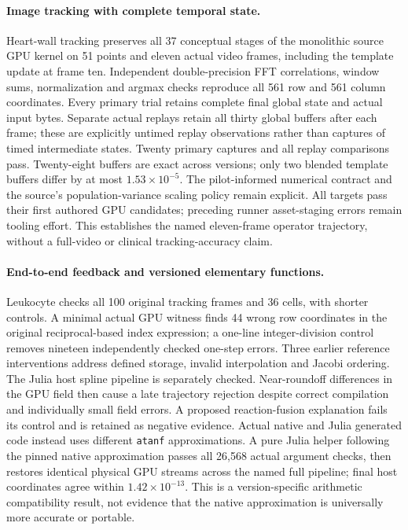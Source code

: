 \paragraph{Image tracking with complete temporal state.}
Heart-wall tracking preserves all 37 conceptual stages of the monolithic source GPU kernel on 51 points and eleven actual video frames, including the template update at frame ten. Independent double-precision FFT correlations, window sums, normalization and argmax checks reproduce all 561 row and 561 column coordinates. Every primary trial retains complete final global state and actual input bytes. Separate actual replays retain all thirty global buffers after each frame; these are explicitly untimed replay observations rather than captures of timed intermediate states. Twenty primary captures and all replay comparisons pass. Twenty-eight buffers are exact across versions; only two blended template buffers differ by at most $1.53\times10^{-5}$. The pilot-informed numerical contract and the source's population-variance scaling policy remain explicit. All targets pass their first authored GPU candidates; preceding runner asset-staging errors remain tooling effort. This establishes the named eleven-frame operator trajectory, without a full-video or clinical tracking-accuracy claim.

\paragraph{End-to-end feedback and versioned elementary functions.}
Leukocyte checks all 100 original tracking frames and 36 cells, with shorter controls. A minimal actual GPU witness finds 44 wrong row coordinates in the original reciprocal-based index expression; a one-line integer-division control removes nineteen independently checked one-step errors. Three earlier reference interventions address defined storage, invalid interpolation and Jacobi ordering. The Julia host spline pipeline is separately checked. Near-roundoff differences in the GPU field then cause a late trajectory rejection despite correct compilation and individually small field errors. A proposed reaction-fusion explanation fails its control and is retained as negative evidence. Actual native and Julia generated code instead uses different \texttt{atanf} approximations. A pure Julia helper following the pinned native approximation passes all 26,568 actual argument checks, then restores identical physical GPU streams across the named full pipeline; final host coordinates agree within $1.42\times10^{-13}$. This is a version-specific arithmetic compatibility result, not evidence that the native approximation is universally more accurate or portable.

